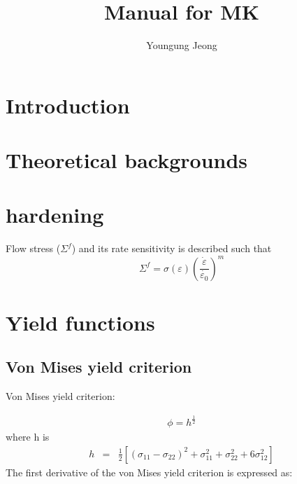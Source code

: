 \documentclass[12pt]{amsart}
\author{Youngung Jeong}
\title{Manual for MK}
\begin{document}
\newpage
\maketitle
\newpage
\setcounter{tocdepth}{1}
\tableofcontents

\section{Introduction}
\label{sec:intro}

\section{Theoretical backgrounds}
\label{sec:theory}


\section{hardening}
Flow stress ($\Sigma^f$) and its rate sensitivity is described such that
\begin{equation}
\Sigma^f=\sigma(\varepsilon)(\frac{\dot{\varepsilon}}{\dot{\varepsilon_0}})^m
\end{equation}

\section{Yield functions}
\label{sec:yieldfunctions}
\subsection{Von Mises yield criterion}
\label{sec:vm}
Von Mises yield criterion:

\begin{eqnarray}
  \label{eq:vonMises}
  \phi=h^{\frac{1}{2}}
\end{eqnarray}
where h is
\begin{eqnarray}
  \label{eq:vonMises2}
  h &=& \frac{1}{2} [(\sigma_{11}-\sigma_{22})^2+\sigma_{11}^2+\sigma_{22}^2+6\sigma_{12}^2]
\end{eqnarray}
The first derivative of the von Mises yield criterion is expressed as:
\end{document}
